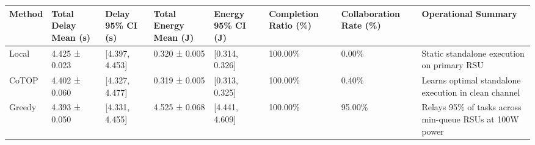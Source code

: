 \begin{tabular}{llllllll}
\toprule
Method & Total Delay Mean (s) & Delay 95\% CI (s) & Total Energy Mean (J) & Energy 95\% CI (J) & Completion Ratio (\%) & Collaboration Rate (\%) & Operational Summary \\
\midrule
Local & 4.425 ± 0.023 & [4.397, 4.453] & 0.320 ± 0.005 & [0.314, 0.326] & 100.00\% & 0.00\% & Static standalone execution on primary RSU \\
CoTOP & 4.402 ± 0.060 & [4.327, 4.477] & 0.319 ± 0.005 & [0.313, 0.325] & 100.00\% & 0.40\% & Learns optimal standalone execution in clean channel \\
Greedy & 4.393 ± 0.050 & [4.331, 4.455] & 4.525 ± 0.068 & [4.441, 4.609] & 100.00\% & 95.00\% & Relays 95\% of tasks across min-queue RSUs at 100W power \\
\bottomrule
\end{tabular}

